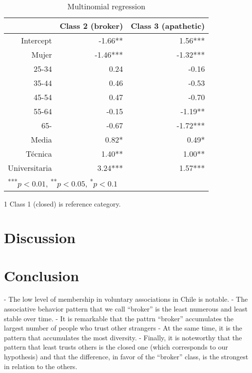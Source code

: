 \begin{table}[H]
\centering
\begin{threeparttable}
\caption{\label{demo-table} Multinomial regression}
\begin{tabular}{rrr}
  \hline
 & Class 2 (broker) & Class 3 (apathetic)\\ 
  \hline
Intercept & -1.66** & 1.56*** \\ 
  Mujer & -1.46*** & -1.32*** \\ 
  25-34 & 0.24 & -0.16 \\ 
  35-44 & 0.46 & -0.53 \\ 
  45-54 & 0.47 & -0.70 \\ 
  55-64 & -0.15 & -1.19** \\ 
  65- & -0.67 & -1.72*** \\ 
  Media & 0.82* & 0.49* \\ 
  Técnica & 1.40** & 1.00** \\ 
  Universitaria & 3.24*** & 1.57*** \\ 
   \hline
\multicolumn{3}{l}{\textsuperscript{***}$p<0.01$, 
  \textsuperscript{**}$p<0.05$, 
  \textsuperscript{*}$p<0.1$}
\end{tabular}
\begin{tablenotes}
    \item[1] Class 1 (closed) is reference category.
  \end{tablenotes}
\end{threeparttable}
\end{table}




\section{Discussion}

\section{Conclusion}

- The low level of membership in voluntary associations in Chile is notable.
- The associative behavior pattern that we call “broker” is the least numerous and least stable over time.
- It is remarkable that the pattrn “broker” accumulates the largest number of people who trust other strangers
- At the same time, it is the pattern that accumulates the most diversity.
- Finally, it is noteworthy that the pattern that least trusts others is the
closed one (which corresponds to our hypothesis) and that the difference, in favor of the “broker” class, is the strongest in relation to the others.

